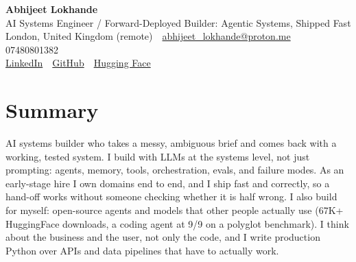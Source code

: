\documentclass[10pt,a4paper]{article}
\newcommand{\sep}{\,\textcolor{accent!60}{\textbar}\,}
\begin{document}
\begin{center}
  {\fontsize{24}{26}\selectfont\bfseries Abhijeet Lokhande}\\[3pt]
  {\color{accent}\large AI Systems Engineer / Forward-Deployed Builder: Agentic Systems, Shipped Fast}\\[5pt]
  {\small
    London, United Kingdom (remote) \sep
    \href{mailto:abhijeet_lokhande@proton.me}{abhijeet\_lokhande@proton.me} \sep
    07480801382 \\[2pt]
    \href{https://www.linkedin.com/in/ablds/}{LinkedIn} \sep
    \href{https://github.com/abhijeetscode}{GitHub} \sep
    \href{https://huggingface.co/ab-ai}{Hugging Face}
  }
\end{center}
\vspace{2pt}

\section{Summary}
AI systems builder who takes a messy, ambiguous brief and comes back with a working, tested system. I build with LLMs at the systems level, not just prompting: agents, memory, tools, orchestration, evals, and failure modes. As an early-stage hire I own domains end to end, and I ship fast and correctly, so a hand-off works without someone checking whether it is half wrong. I also build for myself: open-source agents and models that other people actually use (67K+ HuggingFace downloads, a coding agent at 9/9 on a polyglot benchmark). I think about the business and the user, not only the code, and I write production Python over APIs and data pipelines that have to actually work.

\end{document}
